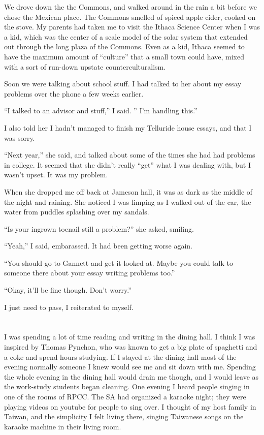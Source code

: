 We drove down the the Commons, and walked around in the rain a bit before we
chose the Mexican place.  The Commons smelled of spiced apple cider, cooked on
the stove.  My parents had taken me to visit the Ithaca Science Center when I
was a kid, which was the center of a scale model of the solar system that
extended out through the long plaza of the Commons.  Even as a kid, Ithaca
seemed to have the maximum amount of ``culture'' that a small town could have,
mixed with a sort of run-down upstate counterculturalism.

Soon we were talking about school stuff.  I had talked to her about my essay
problems over the phone a few weeks earlier. 

``I talked to an advisor and stuff,'' I said.   '' I'm handling this.''

I also told her I hadn't managed to finish my Telluride house essays, and that I
was sorry.  

``Next year,'' she said, and talked about some of the times she had had problems
in college.  It seemed that she didn't really ``get'' what I was dealing with,
but I wasn't upset.  It was my problem.

When she dropped me off back at Jameson hall, it was as dark as the middle of
the night and raining.  She noticed I was limping as I walked out of the car,
the water from puddles splashing over my sandals.

``Is your ingrown toenail still a problem?'' she asked, smiling.

``Yeah,'' I said, embarassed.  It had been getting worse again.  

``You should go to Gannett and get it looked at.  Maybe you could talk to
someone there about your essay writing problems too.''

``Okay, it'll be fine though.  Don't worry.''

I just need to pass, I reiterated to myself.

\section{}

I was spending a lot of time reading and writing in the dining hall.  I think I
was inspired by Thomas Pynchon, who was known to get a big plate of spaghetti
and a coke and spend hours studying.  If I stayed at the dining hall most of the
evening normally someone I knew would see me and sit down with me.  Spending the
whole evening in the dining hall would drain me though, and I would leave as the
work-study students began cleaning.  One evening I heard people singing in one
of the rooms of RPCC.  The SA had organized a karaoke night; they were playing
videos on youtube for people to sing over.  I thought of my host family in
Taiwan, and the simplicity I felt living there, singing Taiwanese songs on the
karaoke machine in their living room.  

